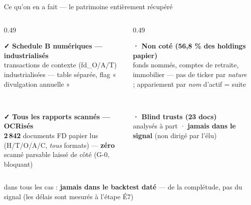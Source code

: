 \documentclass[11pt,aspectratio=169]{beamer}
\begin{document}
\begin{frame}{Ce qu'on en a fait — le patrimoine entièrement récupéré}
  \centering
  \begin{columns}[T]
    \begin{column}{0.49\textwidth}
      \colorbox{okgreen!12}{\parbox[t][24mm][t]{\dimexpr\linewidth-8pt}{\vspace{1mm}
        {\color{okgreen}\footnotesize\textbf{✓ Schedule B numériques — industrialisés}}\\[0.8mm]
        {\scriptsize transactions de contexte (fd\_O/A/T) industrialisées —
         table séparée, flag « divulgation annuelle »}}}\\[2mm]
      \colorbox{okgreen!12}{\parbox[t][24mm][t]{\dimexpr\linewidth-8pt}{\vspace{1mm}
        {\color{okgreen}\footnotesize\textbf{✓ Tous les rapports scannés — OCRisés}}\\[0.8mm]
        {\scriptsize \textbf{2\,842} documents FD papier lus (H/T/O/A/C, \emph{tous}
         formats) — \textbf{zéro} scanné parsable laissé de côté (G-0, bloquant)}}}
    \end{column}
    \begin{column}{0.49\textwidth}
      \colorbox{grisC!10}{\parbox[t][24mm][t]{\dimexpr\linewidth-8pt}{\vspace{1mm}
        {\color{grisC}\footnotesize\textbf{· Non coté (56,8 \% des holdings papier)}}\\[0.8mm]
        {\scriptsize fonds nommés, comptes de retraite, immobilier — pas de ticker par
         \emph{nature} ; appariement par \emph{nom} d'actif = suite}}}\\[2mm]
      \colorbox{grisC!10}{\parbox[t][24mm][t]{\dimexpr\linewidth-8pt}{\vspace{1mm}
        {\color{grisC}\footnotesize\textbf{· Blind trusts (23 docs)}}\\[0.8mm]
        {\scriptsize analysés à part · \textbf{jamais dans le signal} (non dirigé par l'élu)}}}
    \end{column}
  \end{columns}
  \vspace{2.5mm}
  \colorbox{alertred}{\parbox{0.9\textwidth}{\footnotesize\color{white}\centering
    dans tous les cas : \textbf{jamais dans le backtest daté} — de la complétude,
    pas du signal (les délais sont mesurés à l'étape É7)}}
\end{frame}
\end{document}
